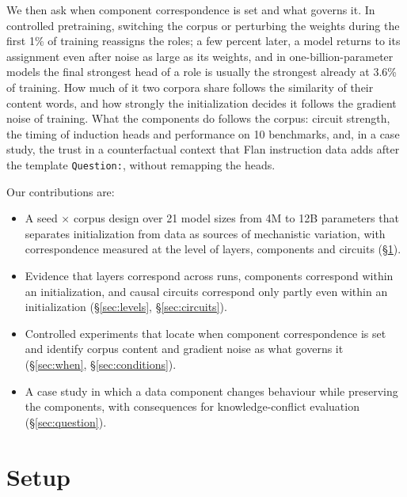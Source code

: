 \documentclass[11pt]{article}
\newcommand{\tmpl}[1]{\texttt{#1}}
\begin{document}
We then ask when component correspondence is set and what governs it.
In controlled pretraining, switching the corpus or perturbing the weights during the first 1\% of training reassigns the roles; a few percent later, a model returns to its assignment even after noise as large as its weights, and in one-billion-parameter models the final strongest head of a role is usually the strongest already at 3.6\% of training.
How much of it two corpora share follows the similarity of their content words, and how strongly the initialization decides it follows the gradient noise of training.
What the components do follows the corpus: circuit strength, the timing of induction heads and performance on 10 benchmarks, and, in a case study, the trust in a counterfactual context that Flan instruction data adds after the template \tmpl{Question:}, without remapping the heads.

Our contributions are:
\begin{itemize}[leftmargin=*,itemsep=1pt,topsep=2pt]
  \item A seed $\times$ corpus design over 21 model sizes from 4M to 12B parameters that separates initialization from data as sources of mechanistic variation, with correspondence measured at the level of layers, components and circuits (\S\ref{sec:setup}).
  \item Evidence that layers correspond across runs, components correspond within an initialization, and causal circuits correspond only partly even within an initialization (\S\ref{sec:levels}, \S\ref{sec:circuits}).
  \item Controlled experiments that locate when component correspondence is set and identify corpus content and gradient noise as what governs it (\S\ref{sec:when}, \S\ref{sec:conditions}).
  \item A case study in which a data component changes behaviour while preserving the components, with consequences for knowledge-conflict evaluation (\S\ref{sec:question}).
\end{itemize}

\section{Setup}
\label{sec:setup}
\end{document}
